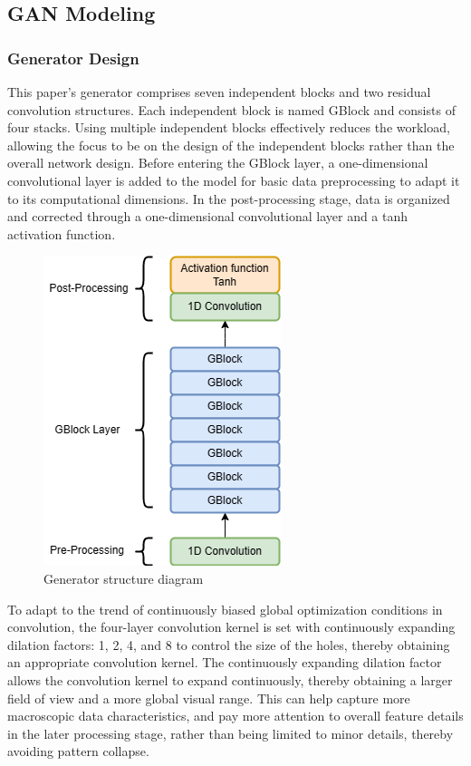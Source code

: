\documentclass[10pt,journal,compsoc]{IEEEtran}
\begin{document}
\subsection{GAN Modeling}

\subsubsection{Generator Design}

This paper's generator comprises seven independent blocks and two residual convolution structures. Each independent block is named GBlock and consists of four stacks. Using multiple independent blocks effectively reduces the workload, allowing the focus to be on the design of the independent blocks rather than the overall network design. Before entering the GBlock layer, a one-dimensional convolutional layer is added to the model for basic data preprocessing to adapt it to its computational dimensions. In the post-processing stage, data is organized and corrected through a one-dimensional convolutional layer and a tanh activation function.

\begin{figure}
    \centering
    \includegraphics[scale=0.7] {PNG/3-2.png}
    \caption{Generator structure diagram}
    \label{fig:3-2}
\end{figure}

To adapt to the trend of continuously biased global optimization conditions in convolution, the four-layer convolution kernel is set with continuously expanding dilation factors: 1, 2, 4, and 8 to control the size of the holes, thereby obtaining an appropriate convolution kernel. The continuously expanding dilation factor allows the convolution kernel to expand continuously, thereby obtaining a larger field of view and a more global visual range. This can help capture more macroscopic data characteristics, and pay more attention to overall feature details in the later processing stage, rather than being limited to minor details, thereby avoiding pattern collapse.
\end{document}
